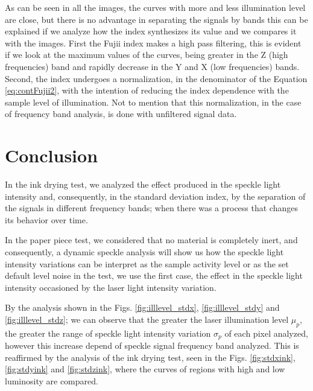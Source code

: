 \documentclass[review]{elsarticle}
\begin{document}
As can be seen in all the images, the curves with more and less  illumination level are close,
but there is no advantage in separating the signals by bands
this can be explained if we analyze how the index synthesizes its value and we compares it with the images.
First the Fujii index makes a high pass filtering,
this is evident if we look at the maximum values of the curves,
being greater in the Z (high frequencies) band and rapidly decrease in the Y and X (low frequencies) bands.
Second, the index undergoes a normalization, in the denominator of the Equation \ref{eq:contFujii2},
with the intention of reducing the index dependence with the sample level of illumination.
Not to mention that this normalization, in the case of frequency band analysis, is done with unfiltered signal data.

\section{Conclusion} 

In the ink drying test, 
we analyzed the effect produced in  the speckle light intensity and, consequently, in the standard deviation index, 
by the separation of the signals in different frequency bands;
when there was a process that changes its behavior over time.

In the paper piece test, we considered that no material is completely inert, 
and consequently, 
a dynamic speckle analysis will show us how the speckle light intensity variations can be interpret as the sample activity level or as the set default level noise in the test,
we use the first case,
the effect in the speckle light intensity occasioned by the laser light intensity variation.


By the analysis shown in the Figs. \ref{fig:illlevel_stdx}, \ref{fig:illlevel_stdy} and \ref{fig:illlevel_stdz};
we can observe that the greater the laser illumination level $\mu_p$, 
the greater the range of speckle light intensity variation $\sigma_p$ of each pixel analyzed, 
however this increase depend of speckle signal frequency band analyzed.
This is reaffirmed by the analysis of the ink drying test, 
seen in the Figs. \ref{fig:stdxink}, \ref{fig:stdyink} and \ref{fig:stdzink},
where the curves of regions with high and low luminosity are compared.
\end{document}
